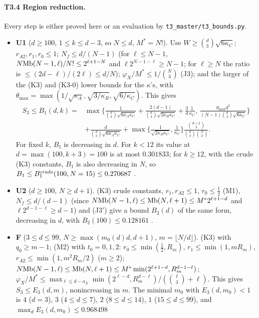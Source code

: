 \documentclass[11pt]{article}
\theoremstyle{definition}
\theoremstyle{remark}
\begin{document}
\paragraph{T3.4 Region reduction.} Every step is either proved here or an evaluation by \nolinkurl{t3_master/t3_bounds.py}.
\begin{itemize}
\item \textbf{U1} ($d\ge100$, $1\le k\le d-3$, so $N\le d$, $M^\ast=N!$). Use $W\ge\binom d3\sqrt{6\kappa_C}$; $r_{A2},r_1,r_0\le1$; $N_f\le d/(N-1)$
(for $\ell\le N-1$, $N\mathrm{Mb}(N-1,\ell)/N!\le2^{\ell+1-N}$ and $\ell2^{N-1-\ell}\ge N-1$; for $\ell\ge N$ the ratio is $\le(2d-\ell)/(2\ell)\le d/N$);
$\varphi_X/M^\ast\le1/\binom N3$ (J3); and the larger of the (K3) and (K3-0) lower bounds for the $\kappa$'s, with $\theta_{\max}=\max(1/\sqrt{\kappa_A},\sqrt{3/\kappa_B},\sqrt{6/\kappa_C})$. This gives
\begin{align*}
S_3\le B_1(d,k)={}&\max\Big\{\frac{1}{\binom d3\sqrt{6\kappa_A\kappa_C}}+\frac{2(d-1)}{\binom d3\sqrt{2\kappa_B\kappa_C}}+\frac3d\frac1{\kappa_C},\ \frac{\theta_{\max}d^2}{(N-1)\binom d3\sqrt{6\kappa_C}}\Big\}\\
&+\frac{d}{\binom d3\sqrt{6\kappa_A\kappa_C}}+\max\Big\{\frac1{\sqrt{2\kappa_B\kappa_C}},\frac1{\kappa_C}\Big\}\frac{\binom{d+2}3}{\binom d3\binom N3}.
\end{align*}
For fixed $k$, $B_1$ is decreasing in $d$. For $k<12$ its value at $d=\max(100,k+3)=100$ is at most $0.301833$; for $k\ge12$, with the crude (K3)
constants, $B_1$ is also decreasing in $N$, so $B_1\le B_1^{\rm crude}(100,N=15)\le0.270687$ .
\item \textbf{U2} ($d\ge100$, $N\ge d+1$). (K3) crude constants, $r_1,r_{A2}\le1$, $r_0\le\frac12$ (M1), $N_f\le d/(d-1)$ (since
$N\mathrm{Mb}(N-1,\ell)\le\mathrm{Mb}(N,\ell+1)\le M^\ast2^{\ell+1-d}$ and $\ell2^{d-1-\ell}\ge d-1$) and (J3$'$) give a bound $B_2(d)$ of the same form, decreasing
in $d$, with $B_2(100)\le0.128161$ .
\item \textbf{F} ($3\le d\le99$, $N\ge\max(m_0(d)d,d+1)$, $m=\lfloor N/d\rfloor$). (K3) with $q_0\ge m-1$; (M2) with $t_0=0,1,2$:
$r_0\le\min(\frac12,R_m)$, $r_1\le\min(1,mR_m)$, $r_{A2}\le\min(1,m^2R_m/2)$ ($m\ge2$); $N\mathrm{Mb}(N-1,\ell)\le\mathrm{Mb}(N,\ell+1)\le M^\ast\min(2^{\ell+1-d},R_m^{d-1-\ell})$;
$\varphi_X/M^\ast\le\max_{\ell\le d-a_X}\min(2^{\ell-d},R_m^{d-\ell})/(\binom\ell3+\ell)$. This gives $S_3\le E_3(d,m)$, nonincreasing in $m$. The minimal
$m_0$ with $E_3(d,m_0)<1$ is $4$ ($d=3$), $3$ ($4\le d\le7$), $2$ ($8\le d\le14$), $1$ ($15\le d\le99$), and $\max_dE_3(d,m_0)\le0.968498$

\end{itemize}
\end{document}
